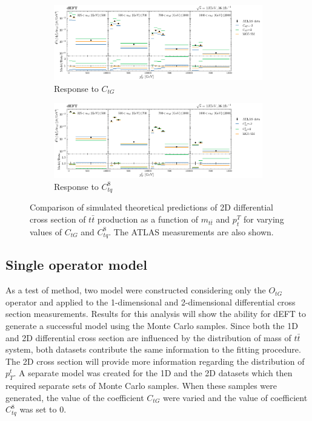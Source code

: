 \documentclass[a4paper,11pt]{article}
\begin{document}
\begin{figure}[H]
    \centering
    \begin{subfigure}[b]{\textwidth}
        \centering
        \includegraphics[width=\textwidth]{plots/data_plot_ctg.png}
        \caption{Response to $C_{tG}$}
    \end{subfigure}

    \begin{subfigure}[b]{\textwidth}
        \centering
        \includegraphics[width=\textwidth]{plots/data_plot_ctq.png}
        \caption{Response to $C_{tq}^{8}$}
    \end{subfigure}
    \caption{Comparison of simulated theoretical predictions of 2D differential cross section of $t\bar{t}$ production as a function of $m_{t\bar{t}}$ and $p_{t}^{T}$ for varying values of $C_{tG}$ and $C_{tq}^{8}$. The ATLAS measurements are also shown.}
    \label{fig:comparison}
\end{figure}

\subsection{Single operator model}\label{sec:analysis_one_op}

As a test of method, two model were constructed considering only the $O_{tG}$ operator and applied to the 1-dimensional and 2-dimensional differential cross section measurements.
Results for this analysis will show the ability for dEFT to generate a successful model using the Monte Carlo samples.
Since both the 1D and 2D differential cross section are influenced by the distribution of mass of $t\bar{t}$ system, both datasets contribute the same information to the fitting procedure.
The 2D cross section will provide more information regarding the distribution of $p_{T}^{t}$.
A separate model was created for the 1D and the 2D datasets which then required separate sets of Monte Carlo samples.
When these samples were generated, the value of the coefficient $C_{tG}$ were varied and the value of coefficient $C_{tq}^{8}$ was set to 0.
\end{document}
